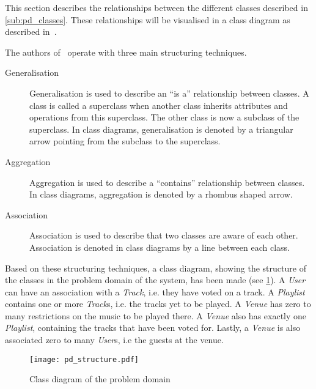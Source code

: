 This section describes the relationships between the different classes
described in \cref{sub:pd_classes}. These relationships will be
visualised in a class diagram as described
in~\cite{mathiassen2001objektorienteret}.

The authors of~\cite{mathiassen2001objektorienteret} operate with three
main structuring techniques.

\begin{description}
\item[Generalisation] Generalisation is used to describe an \enquote{is a}
  relationship between classes. A class is called a
  superclass when another class inherits attributes and operations
  from this superclass. The other class is now a subclass of the
  superclass. In class diagrams, generalisation is denoted by a
  triangular arrow pointing from the subclass to the superclass.
\item[Aggregation] Aggregation is used to describe a
  \enquote{contains} relationship between classes. In class diagrams,
  aggregation is denoted by a rhombus shaped arrow.
\item[Association] Association is used to describe that two classes
  are aware of each other. Association is denoted in class diagrams by
  a line between each class.
\end{description} 

Based on these structuring techniques, a class diagram, showing the structure of the classes in the problem domain of the system, has been made (see \cref{fig:pd_structure}). A \textit{User} can have an association with a \textit{Track}, i.e. they have voted on a track. A \textit{Playlist} contains one or more \textit{Track}s, i.e. the tracks yet to be played. A \textit{Venue} has zero to many restrictions on the music to be played there. A \textit{Venue} also has exactly one \textit{Playlist}, containing the tracks that have been voted for. Lastly, a \textit{Venue} is also associated zero to many \textit{User}s, i.e the guests at the venue.

\begin{figure}[htbp]
  \centering
  \texttt{[image: pd\_structure.pdf]}
  \caption{Class diagram of the problem domain}\label{fig:pd_structure}
\end{figure}
